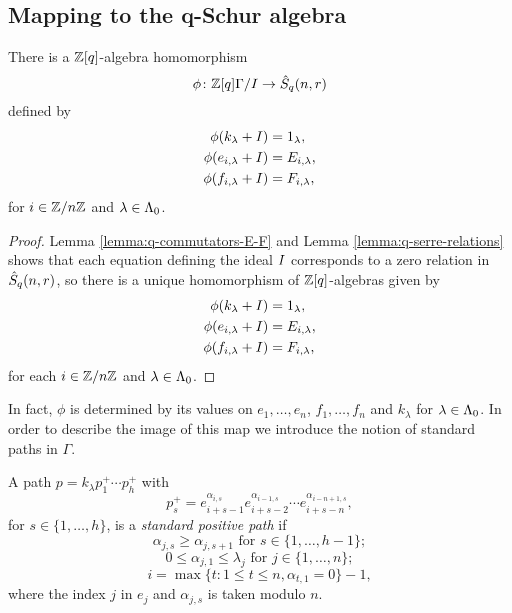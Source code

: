 \documentclass[a4paper, 11pt, twoside]{report}
\begin{document}
\subsection{Mapping to the q-Schur algebra}

\begin{lemma}
There is a $\mathbb{Z}[q]$-algebra homomorphism
\begin{equation*}
\phi\colon\mathbb{Z}[q]\Gamma/I \to\hat{S}_q(n,r)
\end{equation*}
defined by
\begin{align*}
\phi(k_\lambda +I) &= 1_\lambda,\\
\phi(e_{i,\lambda} +I) &= E_{i,\lambda},\\
\phi(f_{i,\lambda} +I) &= F_{i,\lambda},
\end{align*}
for $i\in\mathbb{Z}/{n \mathbb{Z}}$ and $\lambda\in\Lambda_0{}$.
\end{lemma}

\begin{proof}
Lemma \ref{lemma:q-commutators-E-F} and Lemma \ref{lemma:q-serre-relations} shows that each equation defining the ideal $I$ corresponds to a zero relation in $\hat{S}_q(n,r)$, so there is a unique homomorphism of $\mathbb{Z}[q]$-algebras given by
\begin{align*}
\phi(k_\lambda +I) &= 1_\lambda,\\
\phi(e_{i,\lambda} +I) &= E_{i,\lambda},\\
\phi(f_{i,\lambda} +I) &= F_{i,\lambda},
\end{align*}
for each $i\in\mathbb{Z}/{n \mathbb{Z}}$ and $\lambda\in\Lambda_0{}$.
\end{proof}

In fact, $\phi$ is determined by its values on $e_1,\ldots,e_n$, $f_1,\ldots,f_n$ and $k_\lambda$ for $\lambda\in\Lambda_0{}$. In order to describe the image of this map we introduce the notion of standard paths in $\Gamma$.

\begin{definition}\label{def:standard-positive-path}
A path $p=k_\lambda p_1^+\cdots p_h^+$ with
\begin{equation*}
p_s^+ = e_{i+s-1}^{\alpha_{i,s}} e_{i+s-2}^{\alpha_{i-1,s}}\cdots e_{i+s-n}^{\alpha_{i-n+1,s}},
\end{equation*}
for $s\in\{1,\ldots,h\}$, is a \emph{standard positive path} if
\begin{equation*}
\alpha_{j,s}\geq \alpha_{j,s+1} \text{ for } s\in\{1,\ldots,h-1\};
\end{equation*}
\begin{equation*}
0\le \alpha_{j,1}\le\lambda_j \text{ for } j\in\{1,\ldots,n\};
\end{equation*}
\begin{equation*}
i = \max\{t:1\le t\le n, \alpha_{t,1} = 0\} - 1,
\end{equation*}
where the index $j$ in $e_j$ and $\alpha_{j,s}$ is taken modulo $n$.
\end{definition}
\end{document}
